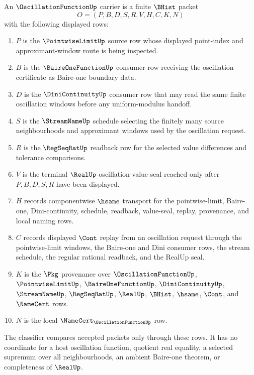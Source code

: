 \begin{definition}
\label{def:oscillation-function-carrier}
An $\OscillationFunctionUp$ carrier is a finite $\BHist$ packet
$$
O=(P,B,D,S,R,V,H,C,K,N)
$$
with the following displayed rows:
\begin{enumerate}
\item $P$ is the $\PointwiseLimitUp$ source row whose displayed point-index and approximant-window route is being inspected.
\item $B$ is the $\BaireOneFunctionUp$ consumer row receiving the oscillation certificate as Baire-one boundary data.
\item $D$ is the $\DiniContinuityUp$ consumer row that may read the same finite oscillation windows before any uniform-modulus handoff.
\item $S$ is the $\StreamNameUp$ schedule selecting the finitely many source neighbourhoods and approximant windows used by the oscillation request.
\item $R$ is the $\RegSeqRatUp$ readback row for the selected value differences and tolerance comparisons.
\item $V$ is the terminal $\RealUp$ oscillation-value seal reached only after $P,B,D,S,R$ have been displayed.
\item $H$ records componentwise $\hsame$ transport for the pointwise-limit, Baire-one, Dini-continuity, schedule, readback, value-seal, replay, provenance, and local naming rows.
\item $C$ records displayed $\Cont$ replay from an oscillation request through the pointwise-limit windows, the Baire-one and Dini consumer rows, the stream schedule, the regular rational readback, and the RealUp seal.
\item $K$ is the $\Pkg$ provenance over $\OscillationFunctionUp$, $\PointwiseLimitUp$, $\BaireOneFunctionUp$, $\DiniContinuityUp$, $\StreamNameUp$, $\RegSeqRatUp$, $\RealUp$, $\BHist$, $\hsame$, $\Cont$, and $\NameCert$ rows.
\item $N$ is the local $\NameCert_{\OscillationFunctionUp}$ row.
\end{enumerate}
The classifier compares accepted packets only through these rows. It has no coordinate for a host oscillation function, quotient real equality, a selected supremum over all neighbourhoods, an ambient Baire-one theorem, or completeness of $\RealUp$.
\end{definition}

